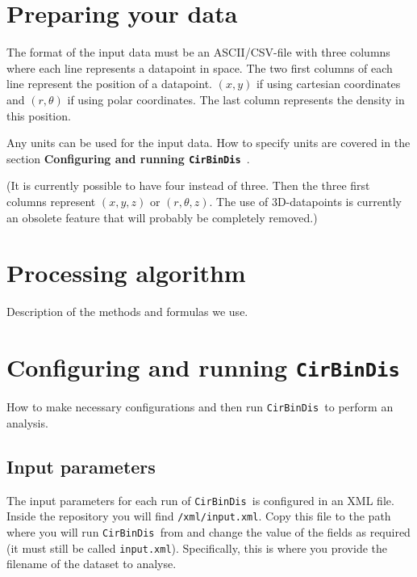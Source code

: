 \documentclass[a4paper, 12pt, english, titlepage]{article}
\newcommand{\sname}{\texttt{CirBinDis }}
\begin{document}
\section{Preparing your data}

The format of the input data must be an ASCII/CSV-file with three columns where each line represents a datapoint in space. The two first columns of each line represent the position of a datapoint. $(x, y)$ if using cartesian coordinates and $(r, \theta)$ if using polar coordinates. The last column represents the density in this position.

Any units can be used for the input data. How to specify units are covered in the section \textbf{Configuring and running \sname}.

(It is currently possible to have four instead of three. Then the three first columns represent $(x, y, z)$ or $(r, \theta, z)$. The use of 3D-datapoints is currently an obsolete feature that will probably be completely removed.)


\section{Processing algorithm}

Description of the methods and formulas we use.


\section{Configuring and running \sname}

How to make necessary configurations and then run \sname to perform an analysis.





\subsection{Input parameters}
    The input parameters for each run of \sname is configured in an XML file. Inside the repository you will find \texttt{/xml/input.xml}. Copy this file to the path where you will run \sname from and change the value of the fields as required (it must still be called \texttt{input.xml}). Specifically, this is where you provide the filename of the dataset to analyse.
\end{document}
